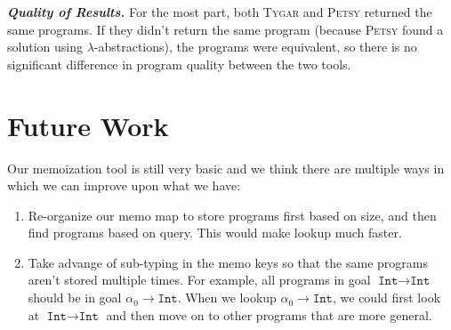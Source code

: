 \documentclass[acmsmall,nonacm]{acmart}
\begin{document}
\vspace{2mm}
\noindent \textbf{\textit{Quality of Results.}} For the most part, both \textsc{Tygar} 
and \textsc{Petsy} returned the same programs. If they didn't return the same program
(because \textsc{Petsy} found a solution using $\lambda$-abstractions),
the programs were equivalent, so there is no significant difference in program quality between the two tools.

\section{Future Work}
\label{future}

Our memoization tool is still very basic and we think there are multiple ways in
which we can improve upon what we have:

\begin{enumerate}
  \item Re-organize our memo map to store programs first based on size, and then 
        find programs based on query. This would make lookup much faster.
  \item Take advange of sub-typing in the memo keys so that the same programs
        aren't stored multiple times. For example, all programs in goal 
        $\texttt{Int} \to \texttt{Int}$ should be in goal $\alpha_0 \to \texttt{Int}$. When
        we lookup $\alpha_0 \to \texttt{Int}$, we could first look at $\texttt{Int} \to \texttt{Int}$
        and then move on to other programs that are more general.
\end{enumerate}

\newpage


 
\end{document}
